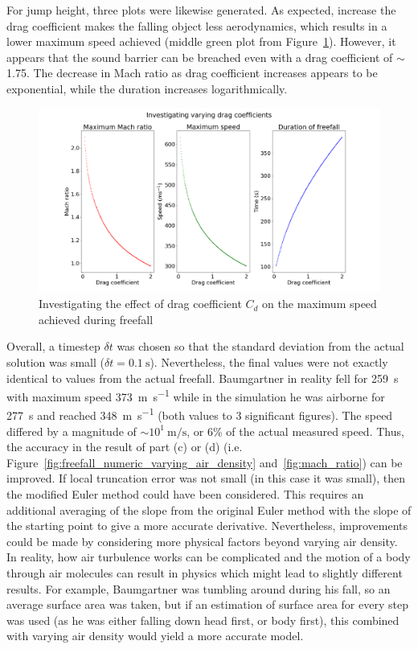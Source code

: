 \documentclass[hyphens,twocolumn,nobalancelastpage,aps,10pt,citeautoscript,longbibliography]{revtex4-2}
\begin{document}
For jump height, three plots were likewise generated. As expected, increase the
drag coefficient makes the falling object less aerodynamics, which results in a
lower maximum speed achieved (middle green plot from
Figure~\ref{fig:drag_coeffs}). However, it appears that the sound barrier can
be breached even with a drag coefficient of $\sim$ 1.75. The decrease in Mach
ratio as drag coefficient increases appears to be exponential, while the
duration increases logarithmically.
\begin{figure}[htpb]
	\centering
	\includegraphics[width=\linewidth]{drag_coeffs.png}
	\caption{Investigating the effect of drag coefficient $C_d$ on the maximum speed achieved during freefall}%
	\label{fig:drag_coeffs}
\end{figure}

Overall, a timestep $\delta t$ was chosen so that the standard deviation from
the actual solution was small ($\delta t = \qty{0.1}{\second}$). Nevertheless,
the final values were not exactly identical to values from the actual freefall.
Baumgartner in reality fell for \qty{259}{\second} with maximum speed
\qty{373}{\metre\per\second} while in the simulation he was airborne for
\qty{277}{\second} and reached \qty{348}{\metre\per\second} (both values to 3
significant figures). The speed differed by a magnitude of $\sim
10^1\qty{}{\metre\per\second}$, or 6\% of the actual measured speed. Thus, the
accuracy in the result of part (c) or (d) (i.e.
Figure~\ref{fig:freefall_numeric_varying_air_density} and~\ref{fig:mach_ratio})
can be improved. If local truncation error was not small (in this case it was
small), then the modified Euler method could have been considered. This
requires an additional averaging of the slope from the original Euler method
with the slope of the starting point to give a more accurate derivative.
Nevertheless, improvements could be made by considering more physical factors
beyond varying air density. In reality, how air turbulence works can be
complicated and the motion of a body through air molecules can result in
physics which might lead to slightly different results. For example,
Baumgartner was tumbling around during his fall, so an average surface area was
taken, but if an estimation of surface area for every step was used (as he was
either falling down head first, or body first), this combined with varying air
density would yield a more accurate model.
\end{document}
